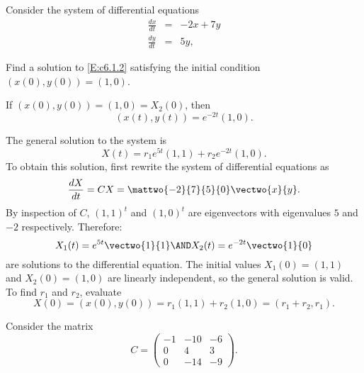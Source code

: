 \documentclass{article}
\begin{document}



\problemlabel

\noindent Consider the system of differential equations \begin{equation}  \label{E:c6.1.2} \begin{array}{rcl} \frac{dx}{dt} & = & -2x+7y \\ \frac{dy}{dt} & = &  5y, \end{array} \end{equation}

\begin{exercise} \label{c6.1.2a}
Find a solution to \eqref{E:c6.1.2}
satisfying the initial condition $(x(0),y(0)) = (1,0)$.

\begin{solution}

\ans If $(x(0),y(0)) = (1,0) = X_2(0)$, then
\[
(x(t),y(t)) = e^{-2t}(1,0).
\]

\soln The general solution to the system is
\[
X(t) = r_1e^{5t}(1,1) + r_2e^{-2t}(1,0).
\]
To obtain this solution, first rewrite the system of differential
equations as
\[
\frac{dX}{dt} = CX = \mattwo{-2}{7}{5}{0}\vectwo{x}{y}.
\]
By inspection of $C$, $(1,1)^t$ and $(1,0)^t$ are eigenvectors with
eigenvalues $5$ and $-2$ respectively.  Therefore:
\[
X_1(t) = e^{5t}\vectwo{1}{1} \AND X_2(t) = e^{-2t}\vectwo{1}{0}
\]
are solutions to the differential equation.
The initial values $X_1(0) = (1,1)$ and $X_2(0) = (1,0)$ are linearly
independent, so the general solution is valid.
To find $r_1$ and $r_2$, evaluate
\[
X(0) = (x(0),y(0)) = r_1(1,1) + r_2(1,0) = (r_1 + r_2,r_1).
\]

\end{solution}
\end{exercise}





\problemlabel

\noindent Consider the matrix \[ C = \left(\begin{array}{rrr} -1 & -10 & -6\\  0 & 4  & 3 \\  0  & -14  & -9 	\end{array}\right). \]
\end{document}

